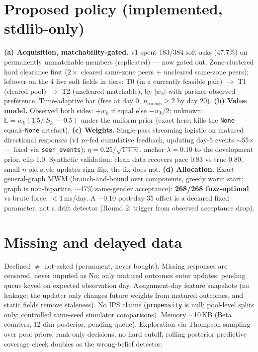 \documentclass[11pt,a4paper]{article}
\begin{document}
\section{Proposed policy (implemented, stdlib-only)}
\textbf{(a) Acquisition, matchability-gated.} v1 spent 183/384 soft asks
(47.7\%) on permanently unmatchable members (replicated) --- now gated out.
Zone-clustered hard clearance first
($2\times$ cleared same-zone peers $+$ uncleared same-zone peers); leftover on
the 4 live soft fields in tiers: T0 (in a currently feasible pair) $\to$ T1
(cleared pool) $\to$ T2 (uncleared matchable), by $|w_k|$ with partner-observed
preference. Time-adaptive bar (free at day 0, $n_{\text{friends}}\ge2$ by day 20).
\textbf{(b) Value model.} Observed both sides: $+w_k$ if equal else $-w_k/2$;
unknown: $\mathbb{E}=w_k(1.5/|S_k|-0.5)$ under the uniform prior (exact here;
kills the \texttt{None}-equals-\texttt{None} artefact). \textbf{(c) Weights.}
Single-pass streaming logistic on matured directional responses (v1 re-fed
cumulative feedback, updating day-5 events $\sim$55$\times$ --- fixed via
\texttt{seen\_events}); $\eta=0.25/\sqrt{1+n}$, anchor $\lambda=0.10$ to the
development prior, clip 1.0. Synthetic validation: clean data recovers pace
0.83 vs true 0.80; small-$n$ old-style updates sign-flip, the fix does not.
\textbf{(d) Allocation.} Exact general-graph MWM (branch-and-bound over
components, greedy warm start; graph is non-bipartite, $\sim$47\% same-gender
acceptance): \textbf{268/268 fuzz-optimal} vs brute force, $<1$\,ms/day. A
$-0.10$ post-day-35 offset is a declared fixed parameter, not a drift
detector (Round 2: trigger from observed acceptance drop).

\section{Missing and delayed data}
Declined $\ne$ not-asked (permanent, never bought). Missing responses are
censored, never imputed as No; only matured outcomes enter updates; pending
queue keyed on expected observation day. Assignment-day feature snapshots (no
leakage; the updater only changes future weights from matured outcomes, and
static fields remove staleness). No IPS claims (\texttt{propensity} is null;
pool-level splits only; controlled same-seed simulator comparisons).
Memory $\sim$10\,KB (Beta counters, 12-dim posterior, pending queue).
Exploration via Thompson sampling over pool priors; rank-only decisions, no
hard cutoff; rolling posterior-predictive coverage check doubles as the
wrong-belief detector.
\end{document}
